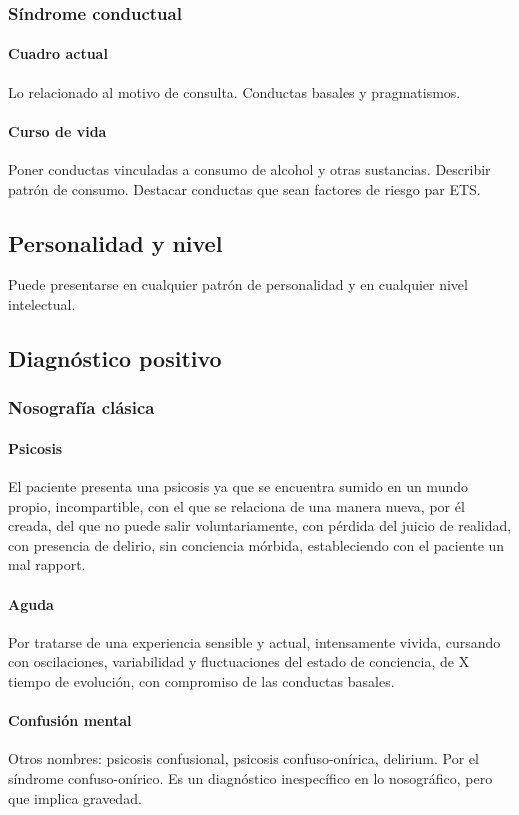 \documentclass{scrbook}
\begin{document}
\subsubsection*{Síndrome conductual}
\paragraph{Cuadro actual}
Lo relacionado al motivo de consulta. Conductas basales y pragmatismos.
\paragraph{Curso de vida}
Poner conductas vinculadas a consumo de alcohol y otras sustancias. Describir patrón de consumo. Destacar conductas que sean factores de riesgo par ETS.
\subsection*{Personalidad y nivel}
Puede presentarse en cualquier patrón de personalidad y en cualquier nivel intelectual.
\subsection*{Diagnóstico positivo}
\subsubsection*{Nosografía clásica}
\paragraph{Psicosis}
El paciente presenta una psicosis ya que se encuentra sumido en un mundo propio, incompartible, con el que se relaciona de una manera nueva, por él creada, del que no puede salir voluntariamente, con pérdida del juicio de realidad, con presencia de delirio, sin conciencia mórbida, estableciendo con el paciente un mal rapport.
\paragraph{Aguda}
Por tratarse de una experiencia sensible y actual, intensamente vivida, cursando con oscilaciones, variabilidad y fluctuaciones del estado de conciencia, de X tiempo de evolución, con compromiso de las conductas basales.
\paragraph{Confusión mental}
Otros nombres: psicosis confusional, psicosis confuso-onírica, delirium.
Por el síndrome confuso-onírico. Es un diagnóstico inespecífico en lo nosográfico, pero que implica gravedad.
\end{document}
